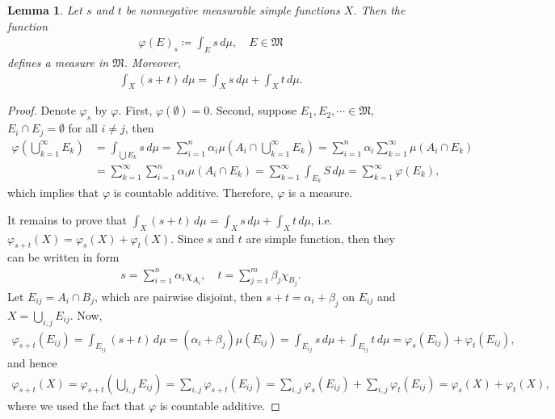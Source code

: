 \documentclass[11pt]{book}
\newtheorem{lemma}{Lemma}[chapter]
\theoremstyle{definition}
\numberwithin{equation}{chapter}
\begin{document}
\begin{lemma}\label{lemma_28}
Let $s$ and $t$ be nonnegative measurable simple functions $X$. Then the function
\begin{align*}
    \varphi(E)_s \coloneqq \int_E s\,d\mu, \quad E\in \mathfrak{M}
\end{align*}
defines a measure in $\mathfrak{M}$. Moreover,
\begin{align*}
    \int_X (s + t)\, d\mu = \int_X s\,d\mu + \int_X t\,d\mu.
\end{align*}
\end{lemma}
\begin{proof}
Denote $\varphi_s$ by $\varphi$. First, $\varphi(\emptyset) = 0$. Second, suppose $E_1, E_2, \cdots \in \mathfrak{M}$, $E_i \cap E_j = \emptyset$ for all $i \neq j$, then
\begin{align*}
    \varphi\left(\bigcup^\infty_{k=1} E_k\right) & = \int_{\bigcup E_k} s\, d\mu = \sum^n_{i=1} \alpha_i \mu \left(A_i \cap \bigcup^\infty_{k=1} E_k\right) = \sum^n_{i=1} \alpha_i \sum^\infty_{k=1} \mu(A_i \cap E_k) \\
    & = \sum^\infty_{k=1} \sum^n_{i=1} \alpha_i \mu(A_i \cap E_k) = \sum^\infty_{k=1} \int_{E_k} S\,d\mu = \sum^\infty_{k=1} \varphi(E_k),
    \end{align*}
which implies that $\varphi$ is countable additive. Therefore, $\varphi$ is a measure. 
    
It remains to prove that $\int_X (s + t)\, d\mu = \int_X s\,d\mu + \int_X t\,d\mu$, i.e. $\varphi_{s+t}(X) = \varphi_s(X) + \varphi_t(X)$. Since $s$ and $t$ are simple function, then they can be written in form
\begin{align*}
    s = \sum^n_{i=1} \alpha_i \chi_{A_i}, \quad t = \sum^m_{j=1} \beta_j \chi_{B_j}.
\end{align*}
Let $E_{ij} = A_i \cap B_j$, which are pairwise disjoint, then $s + t = \alpha_i + \beta_j$ on $E_{ij}$ and $X = \bigcup_{i,j} E_{ij}$. Now,
\begin{align*}
    \varphi_{s+t}(E_{ij}) = \int_{E_{ij}} (s + t)\,d\mu = (\alpha_i + \beta_j) \mu(E_{ij}) = \int_{E_{ij}}s\,d\mu + \int_{E_{ij}}t\,d\mu = \varphi_s(E_{ij}) + \varphi_t(E_{ij}),
\end{align*}
and hence
\begin{align*}
    \varphi_{s+t}(X) = \varphi_{s+t}\left(\bigcup_{i,j} E_{ij}\right) = \sum_{i,j} \varphi_{s+t}(E_{ij}) = \sum_{i,j}\varphi_s(E_{ij}) + \sum_{i,j}\varphi_t(E_{ij}) = \varphi_s(X) + \varphi_t(X),
\end{align*}
where we used the fact that $\varphi$ is countable additive.
\end{proof}
\end{document}
